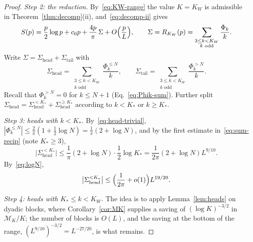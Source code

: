 \begin{proof}
\smallskip
\emph{Step 2: the reduction.} By~\eqref{eq:KW-range} the value $K=K_W$ is admissible in Theorem~\ref{thm:decomp}(ii), and~\eqref{eq:decomp-ii} gives
\begin{equation}\label{eq:S-Sigma}
S(p)=\frac p2\log p+c_0p+\frac{4p}{\pi}\,\Sigma+O\Bigl(\frac pL\Bigr),\qquad\Sigma=R_{K_W}(p)=\sum_{\substack{3\le k<K_W\\ k\text{ odd}}}\frac{\Phi_k}k .
\end{equation}
Write $\Sigma=\Sigma_{\mathrm{head}}+\Sigma_{\mathrm{tail}}$ with
\[
\Sigma_{\mathrm{head}}=\sum_{\substack{3\le k<K_W\\ k\text{ odd}}}\frac{\Phi_k^{\le N}}k,\qquad
\Sigma_{\mathrm{tail}}=\sum_{\substack{3\le k<K_W\\ k\text{ odd}}}\frac{\Phi_k^{>N}}k .
\]
Recall that $\Phi_k^{>N}=0$ for $k\le N+1$ (Eq.~\eqref{eq:Phik-sum}). Further split $\Sigma_{\mathrm{head}}=\Sigma_{\mathrm{head}}^{<K_*}+\Sigma_{\mathrm{head}}^{\ge K_*}$ according to $k<K_*$ or $k\ge K_*$.

\smallskip
\emph{Step 3: heads with $k<K_*$.} By~\eqref{eq:head-trivial}, $|\Phi_k^{\le N}|\le\frac2\pi(1+\frac12\log N)=\frac1\pi(2+\log N)$, and by the first estimate in~\eqref{eq:sum-recip} (note $K_*\ge3$),
\[
\bigl|\Sigma_{\mathrm{head}}^{<K_*}\bigr|\le\frac1\pi(2+\log N)\cdot\frac12\log K_*=\frac1{2\pi}(2+\log N)L^{9/10}.
\]
By~\eqref{eq:logN},
\begin{equation}\label{eq:head-low}
\bigl|\Sigma_{\mathrm{head}}^{<K_*}\bigr|\le\Bigl(\frac1{2\pi}+o(1)\Bigr)L^{19/20}.
\end{equation}

\smallskip
\emph{Step 4: heads with $K_*\le k<K_W$.} The idea is to apply Lemma~\ref{lem:heads} on dyadic blocks, where Corollary~\ref{cor:MK} supplies a saving of $(\log K)^{-3/2}$ in $\mathcal M_K/K$; the number of blocks is $O(L)$, and the saving at the bottom of the range, $(L^{9/10})^{-3/2}=L^{-27/20}$, is what remains.


\end{proof}
